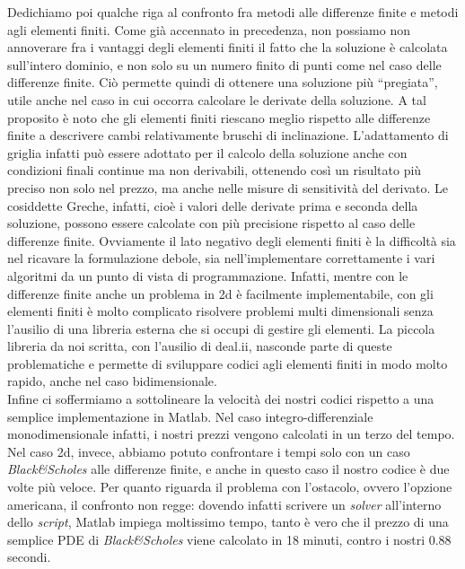 \documentclass[a4paper,10pt]{report}
\theoremstyle{plain}
\theoremstyle{definition}
\theoremstyle{remark}
\begin{document}
Dedichiamo poi qualche riga al confronto fra metodi alle differenze finite e metodi agli elementi finiti. Come gi\`a accennato in precedenza, non possiamo non annoverare fra i vantaggi degli elementi finiti il fatto che la soluzione \`e calcolata sull'intero dominio, e non solo su un numero finito di punti come nel caso delle differenze finite. Ci\`o permette quindi di ottenere una soluzione pi\`u ``pregiata'', utile anche nel caso in cui occorra calcolare le derivate della soluzione. A tal proposito \`e noto che gli elementi finiti riescano meglio rispetto alle differenze finite a descrivere cambi relativamente bruschi di inclinazione. L'adattamento di griglia infatti pu\`o essere adottato per il calcolo della soluzione anche con condizioni finali continue ma non derivabili, ottenendo cos\`i un risultato pi\`u preciso non solo nel prezzo, ma anche nelle misure di sensitivit\`a del derivato. Le cosiddette Greche, infatti, cio\`e i valori delle derivate prima e seconda della soluzione, possono essere calcolate con pi\`u precisione rispetto al caso delle differenze finite. Ovviamente il lato negativo degli elementi finiti \`e la difficolt\`a sia nel ricavare la formulazione debole, sia nell'implementare correttamente i vari algoritmi da un punto di vista di programmazione. Infatti, mentre con le differenze finite anche un problema in 2d \`e facilmente implementabile, con gli elementi finiti \`e molto complicato risolvere problemi multi dimensionali senza l'ausilio di una libreria esterna che si occupi di gestire gli elementi. La piccola libreria da noi scritta, con l'ausilio di \textsf{deal.ii}, nasconde parte di queste problematiche e permette di sviluppare codici agli elementi finiti in modo molto rapido, anche nel caso bidimensionale.\\

Infine ci soffermiamo a sottolineare la velocit\`a dei nostri codici rispetto a una semplice implementazione in \textsf{Matlab}. Nel caso integro-differenziale monodimensionale infatti, i nostri prezzi vengono calcolati in un terzo del tempo. Nel caso 2d, invece, abbiamo potuto confrontare i tempi solo con un caso \emph{Black\&Scholes} alle differenze finite, e anche in questo caso il nostro codice \`e due volte pi\`u veloce. Per quanto riguarda il problema con l'ostacolo, ovvero l'opzione americana, il confronto non regge: dovendo infatti scrivere un \emph{solver} all'interno dello \emph{script}, \textsf{Matlab} impiega moltissimo tempo, tanto \`e vero che il prezzo di una semplice PDE di \emph{Black\&Scholes} viene calcolato in 18 minuti, contro i nostri 0.88 secondi.
\clearpage
{}


\end{document}
